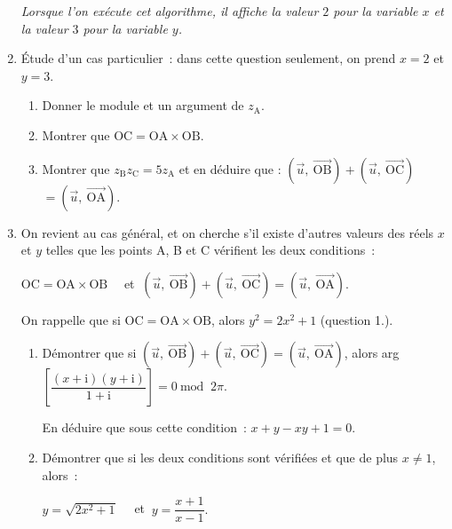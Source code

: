 \begin{enumerate}
\begin{center}
     \end{center}
     \emph{Lorsque l'on exécute cet algorithme, il affiche la valeur $2$ pour la variable $x$ et la valeur $3$ pour la variable $y$.}
     \smallbreak
     \item Étude d'un cas particulier~: dans cette question seulement, on prend $x = 2$ et $y = 3$.
     \begin{enumerate}[label=\alph*.]
          \item Donner le module et un argument de $z_{\text{A}}$.
          \item Montrer que $\text{OC} = \text{OA} \times \text{OB}$.
          \item Montrer que $z_{\text{B}}z_{\text{C}} = 5 z_{\text{A}}$ et en déduire que :
          $\left(\overrightarrow{u},~\overrightarrow{\text{OB}}\right) + \left(\overrightarrow{u},~\overrightarrow{\text{OC}}\right)$\nosp$ = \left(\overrightarrow{u},~\overrightarrow{\text{OA}}\right)$.
     \end{enumerate}
     \item On revient au cas général, et on cherche s'il existe d'autres valeurs des réels $x$ et $y$ telles que les points A, B et C vérifient les deux conditions~:
     \par
     $\text{OC} = \text{OA} \times \text{OB} \quad$ et $\:  \left(\overrightarrow{u},~\overrightarrow{\text{OB}}\right) + \left(\overrightarrow{u},~\overrightarrow{\text{OC}}\right)$\nosp$ = \left(\overrightarrow{u},~\overrightarrow{\text{OA}}\right)$.
     \par
     On rappelle que si $\text{OC} = \text{OA} \times \text{OB}$, alors $y^2 = 2x^2 + 1$ (question 1.).
     \begin{enumerate}[label=\alph*.]
          \item Démontrer que si $\left(\overrightarrow{u},~\overrightarrow{\text{OB}}\right) + \left(\overrightarrow{u},~\overrightarrow{\text{OC}}\right)$\nosp$ = \left(\overrightarrow{u},~\overrightarrow{\text{OA}}\right)$, alors arg$\left[\dfrac{(x + \text{i})(y + \text{i})}{1 + \text{i}}\right] = 0$\nosp$ \:\text{mod }\: 2\pi$.
          \par
          En déduire que sous cette condition~: $x + y - xy + 1 = 0$.
          \item Démontrer que si les deux conditions sont vérifiées et que de plus $x \neq 1$, alors~:
\begin{center}
        $y= \sqrt{2x^2 + 1}\quad $ et $\: y = \dfrac{x + 1}{x - 1}.$
\end{center}

\end{enumerate}
\end{enumerate}
